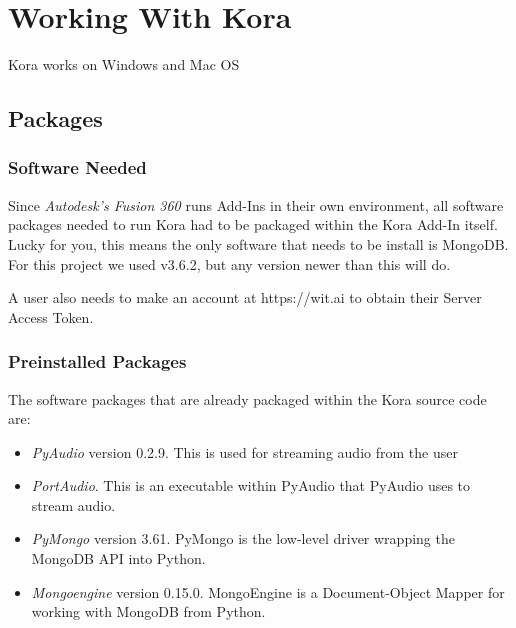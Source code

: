 \documentclass[onecolumn, draftclsnofoot,10pt, compsoc]{IEEEtran}
\begin{document}
	
	
\section{Working With Kora}
Kora works on Windows and Mac OS

\subsection{Packages}
\subsubsection{Software Needed}
Since \textit{Autodesk's Fusion 360} runs Add-Ins in their own environment, all software packages needed to run Kora had to be packaged within the Kora Add-In itself.
Lucky for you, this means the only software that needs to be install is MongoDB.
For this project we used v3.6.2, but any version newer than this will do.

A user also needs to make an account at https://wit.ai to obtain their Server Access Token.


\subsubsection{Preinstalled Packages}
The software packages that are already packaged within the Kora source code are:
	\begin{itemize}
		\item \textit{PyAudio} version 0.2.9. This is used for streaming audio from the user
		\item \textit{PortAudio}. This is an executable within PyAudio that PyAudio uses to stream audio.
		\item \textit{PyMongo} version 3.61. PyMongo is the low-level driver wrapping the MongoDB API into Python.
		\item \textit{Mongoengine} version 0.15.0. MongoEngine is a Document-Object Mapper for working with MongoDB from Python.
	\end{itemize}
\end{document}
